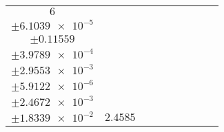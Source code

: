 \documentclass[8pt]{article}
\begin{document}
\begin{longtable}[l]{c c c c c c c c c}
$\num{6}$ & \begin{tabular}[c]{@{}c@{}}$\num{3.0573e-2}$ \\ $\pm\num{6.1039e-5}$\end{tabular} & \begin{tabular}[c]{@{}c@{}}$\num{0.60554}$ \\ $\pm\num{0.11559}$\end{tabular} & \begin{tabular}[c]{@{}c@{}}$\num{8.5006}$ \\ $\pm\num{3.9789e-4}$\end{tabular} & \begin{tabular}[c]{@{}c@{}}$\num{646.27}$ \\ $\pm\num{2.9553e-3}$\end{tabular} & \begin{tabular}[c]{@{}c@{}}$\num{1.2929}$ \\ $\pm\num{5.9122e-6}$\end{tabular} & \begin{tabular}[c]{@{}c@{}}$\num{1.1643}$ \\ $\pm\num{2.4672e-3}$\end{tabular} & \begin{tabular}[c]{@{}c@{}}$\num{4.1993}$ \\ $\pm\num{1.8339e-2}$\end{tabular} & $\num{2.4585}$\\
\bottomrule
\end{longtable}
\end{document}
